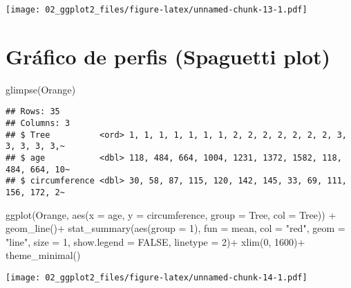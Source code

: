 \documentclass[
]{book}
\newenvironment{Shaded}{\begin{snugshade}}{\end{snugshade}}
\newcommand{\AttributeTok}[1]{\textcolor[rgb]{0.77,0.63,0.00}{#1}}
\newcommand{\ConstantTok}[1]{\textcolor[rgb]{0.00,0.00,0.00}{#1}}
\newcommand{\DecValTok}[1]{\textcolor[rgb]{0.00,0.00,0.81}{#1}}
\newcommand{\FunctionTok}[1]{\textcolor[rgb]{0.00,0.00,0.00}{#1}}
\newcommand{\NormalTok}[1]{#1}
\newcommand{\SpecialCharTok}[1]{\textcolor[rgb]{0.00,0.00,0.00}{#1}}
\newcommand{\StringTok}[1]{\textcolor[rgb]{0.31,0.60,0.02}{#1}}
\begin{document}
\texttt{[image: 02\_ggplot2\_files/figure-latex/unnamed-chunk-13-1.pdf]}

\hypertarget{gruxe1fico-de-perfis-spaguetti-plot}{%
\section{Gráfico de perfis (Spaguetti plot)}\label{gruxe1fico-de-perfis-spaguetti-plot}}

\begin{Shaded}
\begin{Highlighting}[]
\FunctionTok{glimpse}\NormalTok{(Orange)}
\end{Highlighting}
\end{Shaded}

\begin{verbatim}
## Rows: 35
## Columns: 3
## $ Tree          <ord> 1, 1, 1, 1, 1, 1, 1, 2, 2, 2, 2, 2, 2, 2, 3, 3, 3, 3, 3,~
## $ age           <dbl> 118, 484, 664, 1004, 1231, 1372, 1582, 118, 484, 664, 10~
## $ circumference <dbl> 30, 58, 87, 115, 120, 142, 145, 33, 69, 111, 156, 172, 2~
\end{verbatim}

\begin{Shaded}
\begin{Highlighting}[]
\FunctionTok{ggplot}\NormalTok{(Orange, }\FunctionTok{aes}\NormalTok{(}\AttributeTok{x =}\NormalTok{ age, }\AttributeTok{y =}\NormalTok{ circumference, }\AttributeTok{group =}\NormalTok{ Tree, }
                   \AttributeTok{col =}\NormalTok{ Tree)) }\SpecialCharTok{+}
  \FunctionTok{geom\_line}\NormalTok{()}\SpecialCharTok{+}
  \FunctionTok{stat\_summary}\NormalTok{(}\FunctionTok{aes}\NormalTok{(}\AttributeTok{group =} \DecValTok{1}\NormalTok{), }\AttributeTok{fun =}\NormalTok{ mean, }\AttributeTok{col =} \StringTok{"red"}\NormalTok{, }
               \AttributeTok{geom =} \StringTok{"line"}\NormalTok{, }\AttributeTok{size =} \DecValTok{1}\NormalTok{, }\AttributeTok{show.legend =} \ConstantTok{FALSE}\NormalTok{,}
               \AttributeTok{linetype =} \DecValTok{2}\NormalTok{)}\SpecialCharTok{+}
  \FunctionTok{xlim}\NormalTok{(}\DecValTok{0}\NormalTok{, }\DecValTok{1600}\NormalTok{)}\SpecialCharTok{+}
  \FunctionTok{theme\_minimal}\NormalTok{()}
\end{Highlighting}
\end{Shaded}

\texttt{[image: 02\_ggplot2\_files/figure-latex/unnamed-chunk-14-1.pdf]}
\end{document}
